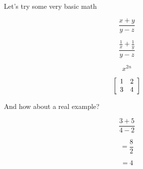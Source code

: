 \documentclass{article}
\begin{document}
Let's try some very basic math

$$ \frac{x+y}{y-z} $$

$$ \frac{\frac{1}{x}+\frac{1}{y}}{y-z} $$

$$ x^{2n} $$	


$$ \left[
  \begin{array}{ c c }
     1 & 2 \\
     3 & 4
  \end{array} \right]
$$

And how about a real example?

$$ \frac{3+5}{4-2} $$

$$ = \frac{8}{2} $$

$$ = 4 $$
\end{document}
